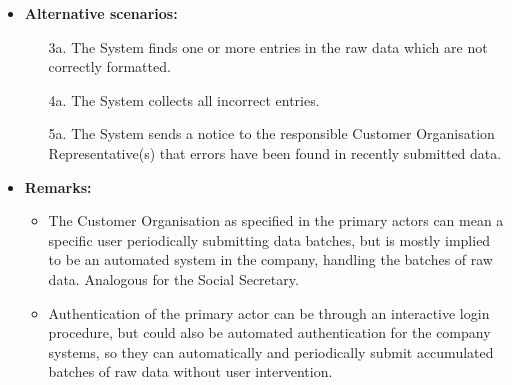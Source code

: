 \documentclass[a4paper,10pt]{article}
\begin{document}
\begin{itemize}
    \item \textbf{Alternative scenarios:} 
    \begin{enumerate}
        \item [3a.] The System finds one or more entries in the raw data which are not correctly formatted.
        \item [4a.] The System collects all incorrect entries.
        \item [5a.] The System sends a notice to the responsible Customer Organisation Representative(s) that errors have been found in recently submitted data.
    \end{enumerate}
    
    \item \textbf{Remarks:}
        \begin{itemize}
            \item The Customer Organisation as specified in the primary actors can mean a specific user periodically submitting data batches, but is mostly implied to be an automated system in the company, handling the batches of raw data. Analogous for the Social Secretary.
            \item Authentication of the primary actor can be through an interactive login procedure, but could also be automated authentication for the company systems, so they can automatically and periodically submit accumulated batches of raw data without user intervention.
        \end{itemize}
\end{itemize}
\end{document}
